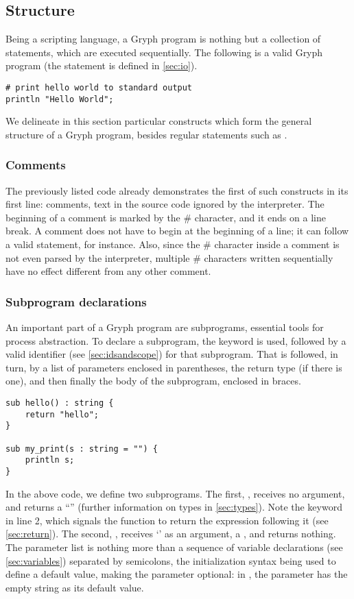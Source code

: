 \subsection{Structure}
Being a scripting language, a Gryph program is nothing but a collection of statements, which are executed sequentially. The following is a valid Gryph program (the  statement is defined in \autoref{sec:io}).

\begin{lstlisting}[language=Gryph]
# print hello world to standard output
println "Hello World";
\end{lstlisting}

We delineate in this section particular constructs which form the general structure of a Gryph program, besides regular statements such as .

\subsubsection{Comments}
The previously listed code already demonstrates the first of such constructs in its first line: comments, text in the source code ignored by the interpreter. The beginning of a comment is marked by the \# character, and it ends on a line break. A comment does not have to begin at the beginning of a line; it can follow a valid statement, for instance. Also, since the \# character inside a comment is not even parsed by the interpreter, multiple \# characters written sequentially have no effect different from any other comment.

\subsubsection{Subprogram declarations}
\label{sec:subprogram}
An important part of a Gryph program are subprograms, essential tools for process abstraction. To declare a subprogram, the  keyword is used, followed by a valid identifier (see \autoref{sec:idsandscope}) for that subprogram. That is followed, in turn, by a list of parameters enclosed in parentheses, the return type (if there is one), and then finally the body of the subprogram, enclosed in braces.
\begin{lstlisting}[language=Gryph]
sub hello() : string {
	return "hello";
}

sub my_print(s : string = "") {
	println s;
}
\end{lstlisting}
In the above code, we define two subprograms. The first, , receives no argument, and returns a ``'' (further information on types in \autoref{sec:types}). Note the  keyword in line 2, which signals the function to return the expression following it (see \autoref{sec:return}). The second, , receives `' as an argument, a , and returns nothing. 
The parameter list is nothing more than a sequence of variable declarations (see \autoref{sec:variables}) separated by semicolons, the initialization syntax being used to define a default value, making the parameter optional: in , the parameter  has the empty string as its default value.

